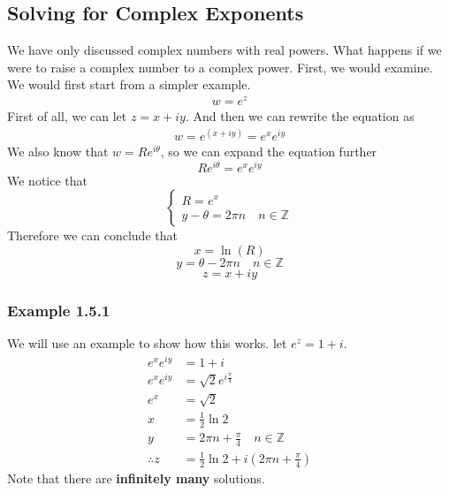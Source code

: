 \documentclass[12pt]{book}
\newcommand{\Z}{\mathbb{Z}}
\newcommand{\paren}[1]{\left( #1 \right)}
\newcommand{\compo}[2]{#1 e^{i #2}}
\begin{document}
\subsection{Solving for Complex Exponents}
We have only discussed complex numbers with real powers. What happens if we were to raise a complex number to a complex power. First, we would examine. We would first start from a simpler example. 
\begin{align}
    w = e^z
\end{align}
First of all, we can let $z = x + iy$. And then we can rewrite the equation as
\begin{align}
w = e^{\paren{x+iy}} = e^xe^{iy}
\end{align}
We also know that $w = \compo{R}{\theta}$, so we can expand the equation further
\[
\compo{R}{\theta} = e^xe^{iy}
\]
We notice that
\[
\begin{cases}
    R = e^x\\
    y - \theta = 2\pi n \quad n \in \Z
\end{cases}
\]
Therefore we can conclude that
\[
x = \ln(R)
\]
\[
y = \theta - 2 \pi n \quad n \in \Z
\]
\[
z = x+iy
\]
\subsubsection{Example 1.5.1}
We will use an example to show how this works. let $e^z = 1+i$.
\begin{align*}
    e^xe^{iy} &= 1+i\\
    e^xe^{iy} &= \compo{\sqrt{2}}{\frac{\pi}{4}}\\
    e^x &= \sqrt{2}\\
    x &= \frac{1}{2}\ln 2\\
    y &= 2\pi n + \frac{\pi}{4} \quad n \in \Z\\
    \therefore z &= \frac{1}{2}\ln 2 + i \paren{2\pi n + \frac{\pi}{4}}
\end{align*}    
Note that there are \textbf{infinitely many} solutions. 
\end{document}
